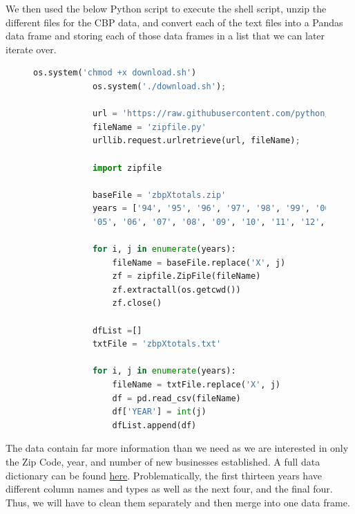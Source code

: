 \documentclass[letter, 11pt]{article} %
\begin{document}
		\noindent We then used the below Python script to execute the shell script, unzip the different files for the CBP data, and convert each of the text files into a Pandas data frame and storing each of those data frames in a list that we can later iterate over.	
	
		\begin{figure}[H]
			\centering
			\begin{lstlisting}[language=python]
			os.system('chmod +x download.sh')
			os.system('./download.sh');
			
			url = 'https://raw.githubusercontent.com/python/cpython/2.7/Lib/zipfile.py'
			fileName = 'zipfile.py'
			urllib.request.urlretrieve(url, fileName);
			
			import zipfile
			
			baseFile = 'zbpXtotals.zip'
			years = ['94', '95', '96', '97', '98', '99', '00', '01', '02', '03', '04', 
			'05', '06', '07', '08', '09', '10', '11', '12', '13', '14']
			
			for i, j in enumerate(years):
				fileName = baseFile.replace('X', j)
				zf = zipfile.ZipFile(fileName)
				zf.extractall(os.getcwd())
				zf.close()
			
			dfList =[]
			txtFile = 'zbpXtotals.txt'
				
			for i, j in enumerate(years):
				fileName = txtFile.replace('X', j)
				df = pd.read_csv(fileName)
				df['YEAR'] = int(j)
				dfList.append(df)
			\end{lstlisting}
		\end{figure}
		
		\pagebreak

		\noindent The data contain far more information than we need as we are interested in only the Zip Code, year, and number of new businesses established. A full data dictionary can be found \href{https://www2.census.gov/programs-surveys/cbp/technical-documentation/records-layouts/noise-layout/zip_totals_layout10.txt}{here}. Problematically, the first thirteen years have different column names and types as well as the next four, and the final four. Thus, we will have to clean them separately and then merge into one data frame.
	
\end{document}
